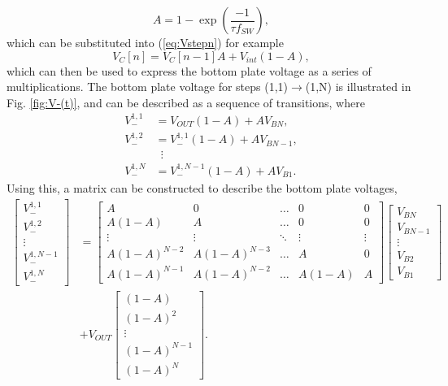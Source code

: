 \documentclass[conference]{article}
\begin{document}
	\begin{equation}
	A = 1-\exp\left(\frac{-1}{\tau f_{SW}}\right),
	\end{equation}
	which can be substituted into (\ref{eq:Vstepn}) for example
	\begin{equation}
		V_{C}[n] = V_C[n-1]A + V_{int}(1-A),
	\end{equation}
	which can then be used to express the bottom plate voltage as a series of multiplications. The bottom plate voltage for steps (1,1)$\rightarrow $(1,N) is illustrated in Fig. \ref{fig:V-(t)}, and can be described as a sequence of transitions, where
	\begin{equation}
	\begin{split}
	V_-^{1,1} &= V_{OUT}(1-A) + AV_{BN},\\
	V_-^{1,2} &= V_-^{1,1}(1-A) + AV_{BN-1},\\
	& \,\,\,\vdots\\
	V_{-}^{1,N} &= V_-^{1,N-1}(1-A) + AV_{B1}.
	\end{split}		
	\end{equation}
	Using this, a matrix can be constructed to describe the bottom plate voltages,
	\begin{equation}
	\begin{split}
	\begin{bmatrix}
	V_-^{1,1} \\
	V_-^{1,2} \\
	\vdots\\
	V_-^{1,N-1} \\ 
	V_-^{1,N}
	\end{bmatrix}
	&\!=\!
	\begin{bmatrix}
	A \!& 0 & \dots & 0 & 0 \\
	A(1-A) \!& A & \dots & 0 & 0\\
	\vdots & \vdots & \ddots & \vdots & \vdots \\
	A(1\!-\!A)^{N-2} \!& A(1\!-\!A)^{N-3} \!& \dots & A & 0\\ 
	A(1\!-\!A)^{N-1} \!& A(1\!-\!A)^{N-2} \!& \dots & A(1-A) & A 
	\end{bmatrix}\!\begin{bmatrix}
	V_{BN} \\
	V_{BN-1} \\
	\vdots \\
	V_{B2} \\
	V_{B1}
	\end{bmatrix}\\&+V_{OUT}\begin{bmatrix}
	(1-A) \\
	(1-A)^2 \\
	\vdots \\
	(1-A)^{N-1} \\
	(1-A)^N
	\end{bmatrix}.
	\end{split}
	\label{eq:V-Matrix}
	\end{equation}
\end{document}
